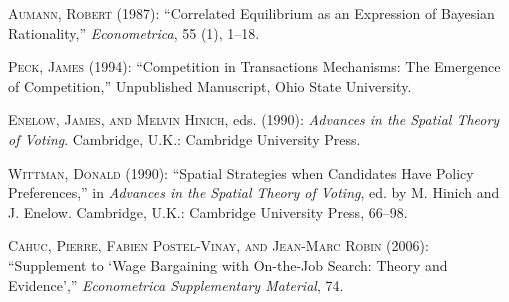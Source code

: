 \documentclass[ecta,nameyear,final,supplement]{econsocart}
\theoremstyle{plain}
\theoremstyle{definition}
\begin{document}



\begin{thebibliography}{}
%
\textsc{Aumann, Robert} (1987):
``Correlated Equilibrium as an Expression of Bayesian Rationality,''
\textit{Econometrica}, 55 (1), 1--18.
\endbibitem

\textsc{Peck, James} (1994):
``Competition in Transactions Mechanisms: The Emergence of Competition,''
Unpublished Manuscript, Ohio State University.
\endbibitem

\textsc{Enelow, James, and Melvin Hinich}, eds. (1990):
\textit{Advances in the Spatial Theory of Voting}.
Cambridge, U.K.: Cambridge University Press.
\endbibitem

\textsc{Wittman, Donald} (1990):
``Spatial Strategies when Candidates Have Policy Preferences,''
in \textit{Advances in the Spatial Theory of Voting},
ed. by M. Hinich and J. Enelow.
Cambridge, U.K.: Cambridge University Press, 66--98.
\endbibitem

\textsc{Cahuc, Pierre, Fabien Postel-Vinay, and Jean-Marc Robin} (2006): ``Supplement to `Wage Bargaining with On-the-Job Search: Theory and Evidence',''
\textit{Econometrica Supplementary Material}, 74.
\endbibitem
\end{thebibliography}
\end{document}
